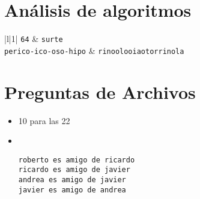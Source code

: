 \section{Análisis de algoritmos}
\begin{table}[htbp]
\begin{center}
\begin{tabular}{|l|1|}
\hline
\texttt{64} & \texttt{surte} \\ \hline
\texttt{perico-ico-oso-hipo} & \texttt{rinoolooiaotorrinola} \\ \hline
\end{tabular}
\end{center}
\end{table}

\section{Preguntas de Archivos}
\begin{itemize}
    \item[1.] 10 para las 22
    \item[2.] \\ \begin{lstlisting}[style=consola]
roberto es amigo de ricardo
ricardo es amigo de javier
andrea es amigo de javier
javier es amigo de andrea
\end{lstlisting}
\end{itemize}